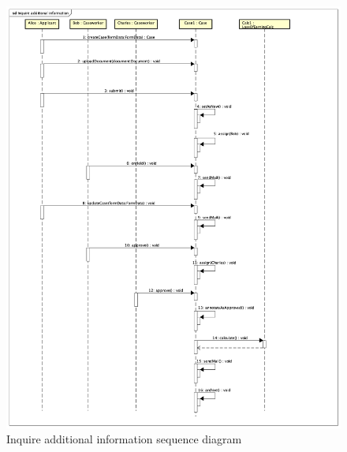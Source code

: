 \begin{figure}
    \centering
    \includegraphics[width=\textwidth]{img/sd-inquire-additional-information.png}
    \caption{Inquire additional information sequence diagram}
\end{figure}

